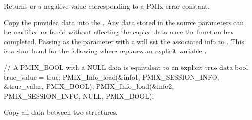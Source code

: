 \format


\begin{arglist}
\end{arglist}

Returns  or a negative value corresponding to a PMIx error constant.

\descr

Copy the provided data into the . Any data stored in the source parameters can be modified or free'd without affecting the copied data once the function has completed. Passing  as the  parameter with a   will set the associated info to . This is a shorthand for the following where  replaces an explicit variable :
\begin{codepar}
  // A PMIX_BOOL with a NULL data is equivalent to an explicit true data
  bool true_value = true;
  PMIX_Info_load(&info1, PMIX_SESSION_INFO, &true_value, PMIX_BOOL);
  PMIX_Info_load(&info2, PMIX_SESSION_INFO, NULL, PMIX_BOOL);
\end{codepar}


\summary

Copy all data between two  structures.

\format


